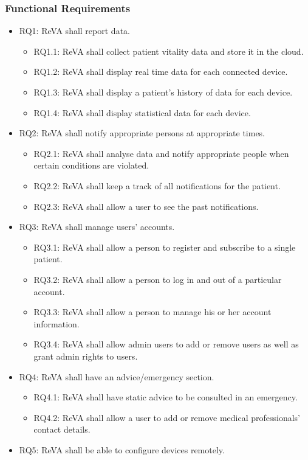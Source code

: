 \subsubsection{Functional Requirements}

\begin{itemize}
\item RQ1: ReVA shall report data.
	\begin{itemize}
	\item RQ1.1: ReVA shall collect patient vitality data and store it in the cloud.
	\item RQ1.2: ReVA shall display real time data for each connected device.
	\item RQ1.3: ReVA shall display a patient's history of data for each device.
	\item RQ1.4: ReVA shall display statistical data for each device.
	\end{itemize}

\item RQ2: ReVA shall notify appropriate persons at appropriate times.
	\begin{itemize}
	\item RQ2.1: ReVA shall analyse data and notify appropriate people when certain conditions are violated.
	\item RQ2.2: ReVA shall keep a track of all notifications for the patient.
	\item RQ2.3: ReVA shall allow a user to see the past notifications.
	\end{itemize}
	
\item RQ3: ReVA shall manage users' accounts.
	\begin{itemize}
	\item RQ3.1: ReVA shall allow a person to register and subscribe to a single patient.
	\item RQ3.2: ReVA shall allow a person to log in and out of a particular account.
	\item RQ3.3: ReVA shall allow a person to manage his or her account information.
	\item RQ3.4: ReVA shall allow admin users to add or remove users as well as grant admin rights to users.
	\end{itemize}

\item RQ4: ReVA shall have an advice/emergency section.
	\begin{itemize}
	\item RQ4.1: ReVA shall have static advice to be consulted in an emergency.
	\item RQ4.2: ReVA shall allow a user to add or remove medical professionals' contact details.
	\end{itemize}
	
\item RQ5: ReVA shall be able to configure devices remotely.
\end{itemize}